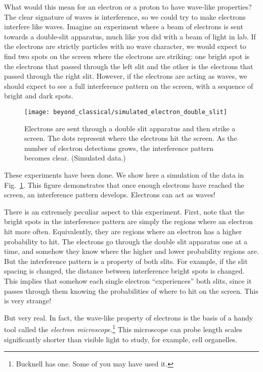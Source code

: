 What would this mean for an electron or a proton to have wave-like
properties?  The clear signature of waves is interference, so we could
try to make electrons interfere like waves.  Imagine an experiment
where a beam of electrons is sent towards a double-slit apparatus,
much like you did with a beam of light in lab.  If the electrons are
strictly particles with no wave character, we would expect to find two
spots on the screen where the electrons are striking: one bright spot
is the electrons that passed through the left slit and the other is
the electrons that passed through the right slit.  However, if the 
electrons are acting as waves, we should expect to see a full
interference pattern on the screen, with a sequence of bright and
dark spots.


\begin{figure}
\begin{center}
\texttt{[image: beyond\_classical/simulated\_electron\_double\_slit]}
\caption{Electrons are sent through a double slit apparatus and then
  strike a screen.  The dots represent where the electrons hit the
  screen.  As the number of electron detections grows, the
  interference pattern becomes clear. (Simulated data.)}
\label{fig:electron_double_slit}
\end{center}
\end{figure}

These experiments have been done.  We show here a simulation of the data in
Fig.~\ref{fig:electron_double_slit}.  This figure demonstrates that
once enough electrons have reached the screen, an interference pattern
develops.  Electrons can act as waves!

There is an extremely peculiar aspect to this experiment.  First, note
that the bright spots in the interference pattern are simply the
regions where an electron hit more often.  Equivalently, they are
regions where an electron has a higher probability to hit.  The
electrons go through the double slit apparatus one at a time, and
somehow they know where the higher and lower probability regions are.
But the interference pattern is a property of both slits.  For
example, if the slit spacing is changed, the distance between
interference bright spots is changed.  This implies that somehow each
single electron ``experiences'' both slits, since it passes through
them knowing the probabilities of where to hit on the screen.  This is
very strange!

But very real.  In fact, the wave-like property of electrons is the
basis of a handy tool called the \textit{electron
  microscope}.\footnote{Bucknell has one.  Some of you may have used
  it.}  This microscope can probe length scales significantly shorter
than visible light to study, for example, cell organelles.


